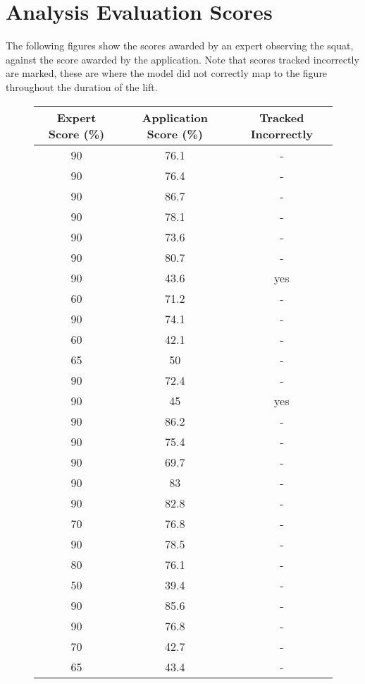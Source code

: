 \section{Analysis Evaluation Scores}
\label{sec:analysis_eval_scores}

The following figures show the scores awarded by an expert observing the squat, against the score awarded by the application. Note that scores tracked incorrectly are marked, these are where the model did not correctly map to the figure throughout the duration of the lift.

\begin{figure}[H]
    \centering
	\begin{tabular}{ | c | c | c | }
	    \hline
	    \textbf{Expert Score (\%)} & \textbf{Application Score (\%)} & \textbf{Tracked Incorrectly} \\ \hline
	    90 & 76.1 & - \\ \hline
		90 & 76.4 & - \\ \hline
		90 & 86.7 & - \\ \hline
		90 & 78.1 & - \\ \hline
		90 & 73.6 & - \\ \hline
		90 & 80.7 & - \\ \hline
		90 & 43.6 & yes \\ \hline
		60 & 71.2 & - \\ \hline
		90 & 74.1 & - \\ \hline
		60 & 42.1 & - \\ \hline
		65 & 50 & - \\ \hline
		90 & 72.4 & - \\ \hline
		90 & 45 & yes \\ \hline
		90 & 86.2 & - \\ \hline
		90 & 75.4 & - \\ \hline
		90 & 69.7 & - \\ \hline
		90 & 83 & - \\ \hline
		90 & 82.8 & - \\ \hline
		70 & 76.8 & - \\ \hline
		90 & 78.5 & - \\ \hline
		80 & 76.1 & - \\ \hline
		50 & 39.4 & - \\ \hline
		90 & 85.6 & - \\ \hline
		90 & 76.8 & - \\ \hline
		70 & 42.7 & - \\ \hline
		65 & 43.4 & - \\ \hline

\end{tabular}
\end{figure}
